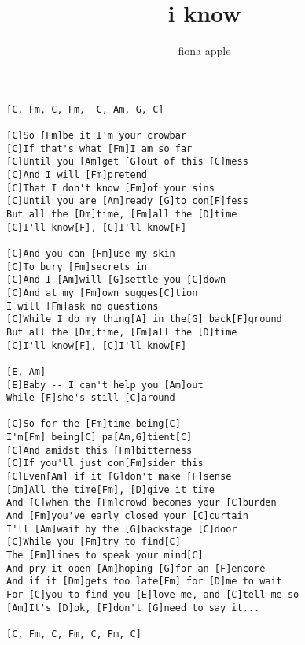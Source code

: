 \author{fiona apple}
\title{i know}
\maketitle
\begin{verbatim}
[C, Fm, C, Fm,  C, Am, G, C]

[C]So [Fm]be it I'm your crowbar
[C]If that's what [Fm]I am so far
[C]Until you [Am]get [G]out of this [C]mess
[C]And I will [Fm]pretend
[C]That I don't know [Fm]of your sins
[C]Until you are [Am]ready [G]to con[F]fess
But all the [Dm]time, [Fm]all the [D]time
[C]I'll know[F], [C]I'll know[F]

[C]And you can [Fm]use my skin
[C]To bury [Fm]secrets in
[C]And I [Am]will [G]settle you [C]down
[C]And at my [Fm]own sugges[C]tion
I will [Fm]ask no questions
[C]While I do my thing[A] in the[G] back[F]ground
But all the [Dm]time, [Fm]all the [D]time
[C]I'll know[F], [C]I'll know[F]

[E, Am]
[E]Baby -- I can't help you [Am]out
While [F]she's still [C]around

[C]So for the [Fm]time being[C]
I'm[Fm] being[C] pa[Am,G]tient[C]
[C]And amidst this [Fm]bitterness
[C]If you'll just con[Fm]sider this
[C]Even[Am] if it [G]don't make [F]sense
[Dm]All the time[Fm], [D]give it time
And [C]when the [Fm]crowd becomes your [C]burden
And [Fm]you've early closed your [C]curtain
I'll [Am]wait by the [G]backstage [C]door
[C]While you [Fm]try to find[C]
The [Fm]lines to speak your mind[C]
And pry it open [Am]hoping [G]for an [F]encore
And if it [Dm]gets too late[Fm] for [D]me to wait
For [C]you to find you [E]love me, and [C]tell me so
[Am]It's [D]ok, [F]don't [G]need to say it...

[C, Fm, C, Fm, C, Fm, C]
\end{verbatim}